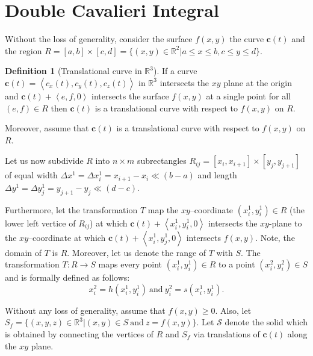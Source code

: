 \documentclass{article}
\theoremstyle{theorem}
\theoremstyle{definition}
\newtheorem*{definition}{Definition}
\begin{document}
\section{Double Cavalieri Integral}
Without the loss of generality, consider the surface $f(x,y)$ the curve $\mathbf{c}(t)$ and the region $R = [a,b]\times [c,d] = \{(x,y)\in \mathbb{R}^2|a \leq x \leq b, c \leq y \leq d\}$.

\begin{definition}[Translational curve in $\mathbb{R}^3$]
If a curve $\mathbf{c}(t) = \left <c_x(t),c_y(t), c_z(t) \right >$ in $\mathbb{R}^3$ intersects the $xy$ plane at the origin and $\mathbf{c}(t) + \left < e,f,0 \right >$ intersects 
the surface $f(x,y)$ at a single point for all $(e,f)\in R$ then $\mathbf{c}(t)$ is a translational curve 
with respect to $f(x,y)$ on $R$. 
\end{definition}

Moreover, assume that $\mathbf{c}(t)$ is a translational curve with respect to $f(x,y)$ on $R$. 

Let us now subdivide $R$ into $n\times m$ subrectangles $R_{ij} = [x_{i},x_{i+1}] \times [y_{j},y_{j+1}]$ of equal width $\Delta x^1 = \Delta x_i^1 = x_{i+1}-x_i\ll (b-a)$ and length $\Delta y^1= \Delta y_j^1 = y_{j+1}-y_j\ll(d-c)$. 


Furthermore, let the transformation $T$ map the $xy$--coordinate $(x_i^1,y_i^1)\in R$ (the lower left vertice of $R_{ij}$) at which $\mathbf{c}(t) + \left <x_i^1,y_i^1,0 \right >$ intersects the 
$xy$-plane to the $xy$--coordinate at which $\mathbf{c}(t) + \left <x_i^1,y_j^1,0 \right >$ intersects $f(x,y)$. Note, the domain of $T$ is $R$. Moreover, let us denote the range 
of $T$ with $S$. The transformation $T:R\rightarrow S$ maps every point $(x_i^1,y_i^1)\in R$ to a point $(x_i^2,y_i^2)\in S$ and is formally defined as follows:
\begin{equation}
x_i^2 = h(x_i^1,y_i^1)~\textrm{and}~y_i^2 = s(x_i^1,y_i^1).
\end{equation}

Without any loss of generality, assume that $f(x,y)\geq0$. Also, let $S_f = \{(x,y,z)\in\mathbb{R}^3|(x,y)\in S ~ \textrm{and} ~ z=f(x,y)\}$. 
Let $\mathcal{S}$ denote the solid which is obtained by connecting the vertices of $R$ and $S_f$ via translations of $\mathbf{c}(t)$ along 
the $xy$ plane.  
\end{document}
